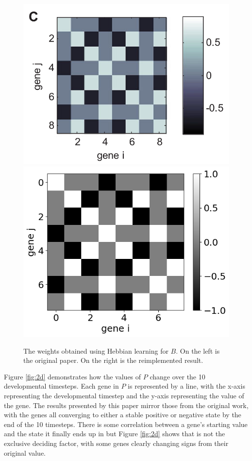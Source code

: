 \documentclass[twocolumn,a4paper,11pt]{article}
\begin{document}
    \begin{figure}[h]
        \centering
        \includegraphics[width=0.48\linewidth]{orig_img/fig2c.png}
        \includegraphics[width=0.48\linewidth]{img/fig2c.png}
        \caption{The weights obtained using Hebbian learning for $B$. On the left is the original paper. On the right is the reimplemented result.} \label{fig:2c}
    \end{figure}

    Figure \ref{fig:2d} demonstrates how the values of $P$ change over the 10 developmental timesteps. Each gene in $P$ is represented by a line, with the x-axis representing the developmental timestep and the y-axis representing the value of the gene. The results presented by this paper mirror those from the original work, with the genes all converging to either a stable positive or negative state by the end of the 10 timesteps. There is some correlation between a gene's starting value and the state it finally ends up in but Figure \ref{fig:2d} shows that is not the exclusive deciding factor, with some genes clearly changing signs from their original value.
\end{document}
